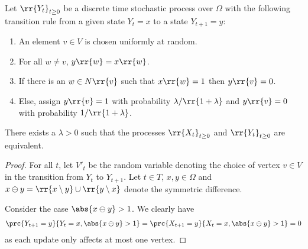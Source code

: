 \documentclass{article}
\begin{document}
\begin{claim*}[1]
  Let $\rr{Y_t}_{t\geq 0}$ be a discrete time stochastic process over $\Omega$ with the
  following transition rule from a given state $Y_t=x$ to a state $Y_{t+1}=y$:
  \begin{enumerate}
    \item An element $v\in V$ is chosen uniformly at random.
    \item For all $w\neq v$, $y\rr{w}=x\rr{w}$.
    \item If there is an $w\in N\rr{v}$ such that $x\rr{w}=1$ then $y\rr{v}=0$.
    \item Else, assign $y\rr{v}=1$ with probability $\lambda/\rr{1+\lambda}$ and $y\rr{v}=0$
      with probability $1/\rr{1+\lambda}$.
  \end{enumerate}
  There exists a $\lambda>0$ such that
  the processes $\rr{X_t}_{t\geq 0}$ and $\rr{Y_t}_{t\geq 0}$ are equivalent.
  \begin{proof}
    For all $t$, let $V'_t$ be the random variable denoting the choice of vertex $v\in V$ in the
    transition from $Y_t$ to $Y_{t+1}$.
    Let $t\in T$, $x,y\in\Omega$ and $x\ominus y=\rr{x\setminus y}\cup\rr{y\setminus x}$
    denote the symmetric difference.

    Consider the case $\abs{x\ominus y}>1$. We clearly have
    \begin{align*}
      \prc{Y_{t+1}=y}{Y_t=x, \abs{x\ominus y}>1} = \prc{X_{t+1}=y}{X_t=x, \abs{x\ominus y}>1} = 0
    \end{align*}
    as each update only affects at most one vertex.


\end{proof}
\end{claim*}
\end{document}
